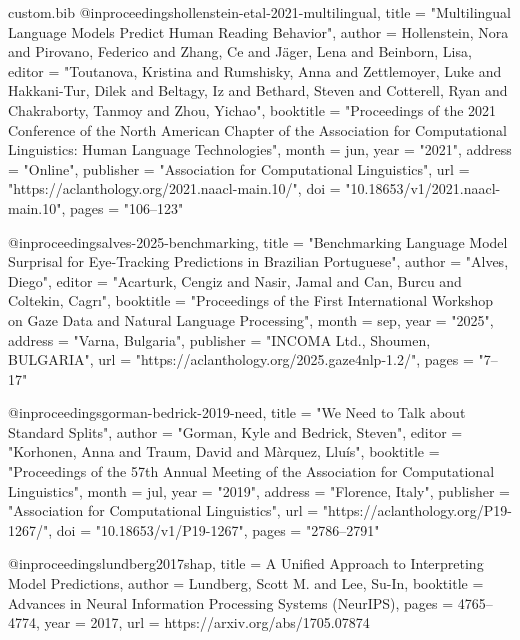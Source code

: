 \begin{filecontents*}[overwrite]{custom.bib}
@inproceedings{hollenstein-etal-2021-multilingual,
    title = "Multilingual Language Models Predict Human Reading Behavior",
    author = {Hollenstein, Nora  and
      Pirovano, Federico  and
      Zhang, Ce  and
      J{\"a}ger, Lena  and
      Beinborn, Lisa},
    editor = "Toutanova, Kristina  and
      Rumshisky, Anna  and
      Zettlemoyer, Luke  and
      Hakkani-Tur, Dilek  and
      Beltagy, Iz  and
      Bethard, Steven  and
      Cotterell, Ryan  and
      Chakraborty, Tanmoy  and
      Zhou, Yichao",
    booktitle = "Proceedings of the 2021 Conference of the North American Chapter of the Association for Computational Linguistics: Human Language Technologies",
    month = jun,
    year = "2021",
    address = "Online",
    publisher = "Association for Computational Linguistics",
    url = "https://aclanthology.org/2021.naacl-main.10/",
    doi = "10.18653/v1/2021.naacl-main.10",
    pages = "106--123"
}

@inproceedings{alves-2025-benchmarking,
    title = "Benchmarking Language Model Surprisal for Eye-Tracking Predictions in {B}razilian {P}ortuguese",
    author = "Alves, Diego",
    editor = "Acarturk, Cengiz  and
      Nasir, Jamal  and
      Can, Burcu  and
      Coltekin, Cagr{\i}",
    booktitle = "Proceedings of the First International Workshop on Gaze Data and Natural Language Processing",
    month = sep,
    year = "2025",
    address = "Varna, Bulgaria",
    publisher = "INCOMA Ltd., Shoumen, BULGARIA",
    url = "https://aclanthology.org/2025.gaze4nlp-1.2/",
    pages = "7--17"
}

@inproceedings{gorman-bedrick-2019-need,
    title = "We Need to Talk about Standard Splits",
    author = "Gorman, Kyle  and
      Bedrick, Steven",
    editor = "Korhonen, Anna  and
      Traum, David  and
      M{\`a}rquez, Llu{\'i}s",
    booktitle = "Proceedings of the 57th Annual Meeting of the Association for Computational Linguistics",
    month = jul,
    year = "2019",
    address = "Florence, Italy",
    publisher = "Association for Computational Linguistics",
    url = "https://aclanthology.org/P19-1267/",
    doi = "10.18653/v1/P19-1267",
    pages = "2786--2791"
}

@inproceedings{lundberg2017shap,
  title        = {A Unified Approach to Interpreting Model Predictions},
  author       = {Lundberg, Scott M. and Lee, Su-In},
  booktitle    = {Advances in Neural Information Processing Systems (NeurIPS)},
  pages        = {4765--4774},
  year         = {2017},
  url          = {https://arxiv.org/abs/1705.07874}
}


\end{filecontents*}
